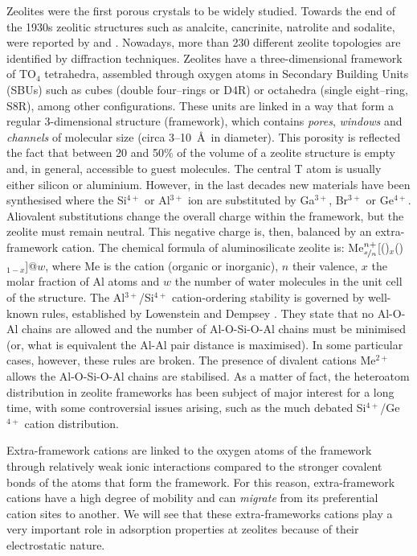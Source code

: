 Zeolites were the first porous crystals to be widely studied.
Towards the end of the 1930s zeolitic structures such as analcite, cancrinite, natrolite and sodalite, were reported by \citet{Taylor1930,Pauling453,BRAGG1930} and \citet{Taylor1934}.
Nowadays, more than 230 different zeolite topologies are identified \cite{baerlocher2007atlas} by diffraction techniques.
Zeolites have a three-dimensional framework of TO$_4$ tetrahedra, assembled through oxygen atoms in Secondary Building Units (SBUs) such as cubes (double four--rings or D4R) or octahedra (single eight--ring, S8R), among other configurations.
These units are linked in a way that form a regular 3-dimensional structure (framework), which contains \emph{pores}, \emph{windows} and \emph{channels} of molecular size (circa 3--10~\AA~in diameter).
This porosity is reflected the fact that between 20 and 50\% of the volume of a zeolite structure is empty and, in general, accessible to guest molecules.
The central T atom is usually either silicon or aluminium.
However, in the last decades new materials have been synthesised where the Si$^{4+}$ or Al$^{3+}$ ion are substituted by Ga$^{3+}$, Br$^{3+}$ or Ge$^{4+}$.
Aliovalent substitutions change the overall charge within the framework, but the zeolite must remain neutral.
This negative charge is, then, balanced by an extra-framework cation.
The chemical formula of aluminosilicate zeolite is: Me$^{n+}_{\nicefrac{x}{n}}$[()$_x$()$_{1-x}$]@$w$, where Me is the cation (organic or inorganic), $n$ their valence, $x$ the molar fraction of Al atoms and $w$ the number of water molecules in the unit cell of the structure. The Al$^{3+}$/Si$^{4+}$ cation-ordering stability is governed by well-known rules, established by Lowenstein and Dempsey \cite{loewenstein,dempsey_1969}.
They state that no Al-O-Al chains are allowed and the number of Al-O-Si-O-Al chains must be minimised (or, what is equivalent the Al-Al pair distance is maximised).
In some particular cases, however, these rules are broken. 
The presence of divalent cations Me$^{2+}$ allows the Al-O-Si-O-Al chains are stabilised.
As a matter of fact, the heteroatom distribution in zeolite frameworks has been subject of major interest for a long time, with some controversial issues arising, such as the much debated Si$^{4+}$/Ge$^{4+}$ cation distribution.


Extra-framework cations are linked to the oxygen atoms of the framework through relatively weak ionic interactions compared to the stronger covalent bonds of the atoms that form the framework. For this reason, extra-framework cations have a high degree of mobility and can \textit{migrate} from its preferential cation sites to another. We will see that these extra-frameworks cations play a very important role in adsorption properties at zeolites because of their electrostatic nature.

